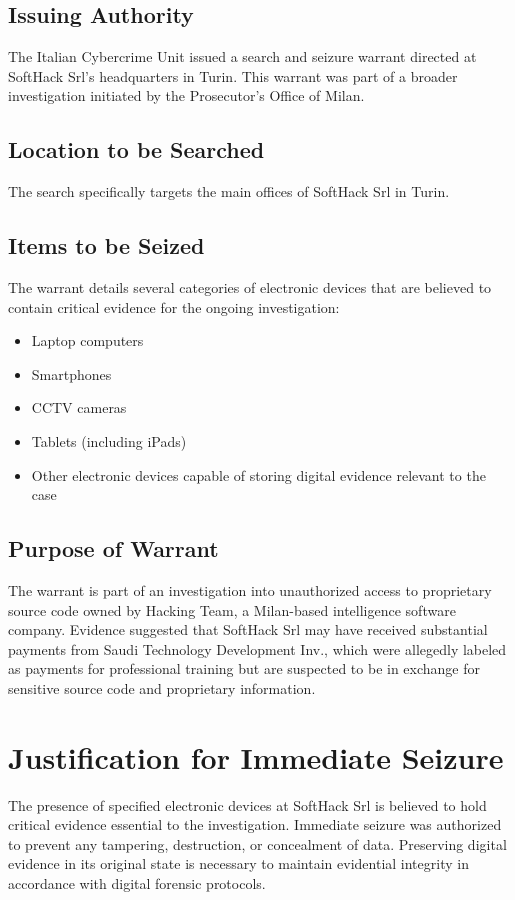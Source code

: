 \subsection{Issuing Authority}
The Italian Cybercrime Unit issued a search and seizure warrant directed at SoftHack Srl's headquarters in Turin. This warrant was part of a broader investigation initiated by the Prosecutor’s Office of Milan.

\subsection{Location to be Searched}
The search specifically targets the main offices of SoftHack Srl in Turin.

\subsection{Items to be Seized}
The warrant details several categories of electronic devices that are believed to contain critical evidence for the ongoing investigation:
\begin{itemize}
    \item Laptop computers
    \item Smartphones
    \item CCTV cameras
    \item Tablets (including iPads)
    \item Other electronic devices capable of storing digital evidence relevant to the case
\end{itemize}

\subsection{Purpose of Warrant}
The warrant is part of an investigation into unauthorized access to proprietary source code owned by Hacking Team, a Milan-based intelligence software company. Evidence suggested that SoftHack Srl may have received substantial payments from Saudi Technology Development Inv., which were allegedly labeled as payments for professional training but are suspected to be in exchange for sensitive source code and proprietary information.

\section{Justification for Immediate Seizure}
The presence of specified electronic devices at SoftHack Srl is believed to hold critical evidence essential to the investigation. Immediate seizure was authorized to prevent any tampering, destruction, or concealment of data. Preserving digital evidence in its original state is necessary to maintain evidential integrity in accordance with digital forensic protocols.

